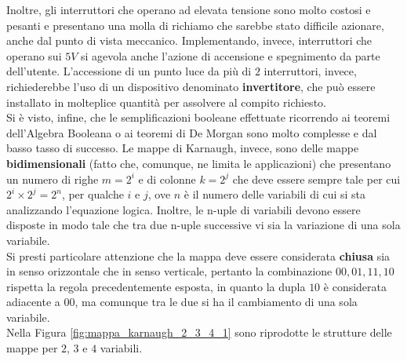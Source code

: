 \documentclass[a4paper]{extarticle}
\begin{document}
Inoltre, gli interruttori che operano ad elevata tensione sono molto costosi e pesanti e presentano una molla di richiamo che sarebbe stato difficile azionare, anche dal punto di vista meccanico. Implementando, invece, interruttori che operano sui \(5 V\) si agevola anche l'azione di accensione e spegnimento da parte dell'utente. L'accessione di un punto luce da più di \(2\) interruttori, invece, richiederebbe l'uso di un dispositivo denominato \textbf{invertitore}, che può essere installato in molteplice quantità per assolvere al compito richiesto.\\
Si è visto, infine, che le semplificazioni booleane effettuate ricorrendo ai teoremi dell'Algebra Booleana o ai teoremi di De Morgan sono molto complesse e dal basso tasso di successo. Le mappe di Karnaugh, invece, sono delle mappe \textbf{bidimensionali} (fatto che, comunque, ne limita le applicazioni) che presentano un numero di righe $m = 2^i$ e di colonne $k = 2^j$ che deve essere sempre tale per cui \(2^i \times 2^j = 2^n\), per qualche $i$ e $j$, ove \(n\) è il numero delle variabili di cui si sta analizzando l'equazione logica. Inoltre, le n-uple di variabili devono essere disposte in modo tale che tra due n-uple successive vi sia la variazione di una sola variabile.\\
Si presti particolare attenzione che la mappa deve essere considerata \textbf{chiusa} sia in senso orizzontale che in senso verticale, pertanto la combinazione \(00, 01, 11, 10\) rispetta la regola precedentemente esposta, in quanto la dupla \(10\) è considerata adiacente a \(00\), ma comunque tra le due si ha il cambiamento di una sola variabile.\\
Nella Figura \ref{fig:mappa_karnaugh_2_3_4_1} sono riprodotte le strutture delle mappe per \(2\), \(3\) e \(4\) variabili.
\end{document}
